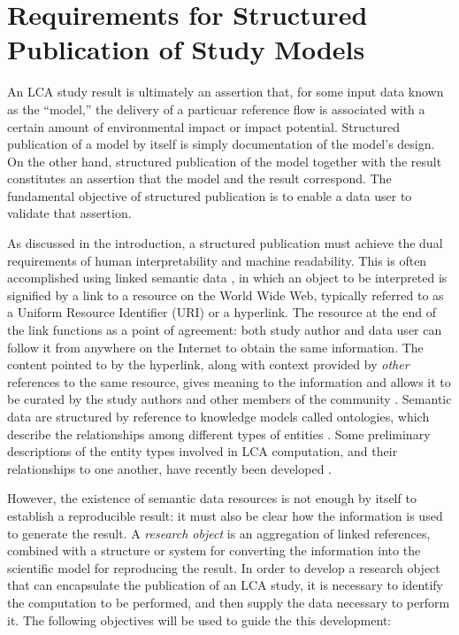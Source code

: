 \section{Requirements for Structured Publication of Study Models}

An LCA study result is ultimately an assertion that, for some input data known as the ``model,'' the delivery of a particuar reference flow %
is associated with a certain amount of environmental impact or impact potential.  Structured publication of a model by itself is simply documentation of the model's design.  On the other hand, structured publication of the model together with the result constitutes an assertion that the model and the result correspond.  The fundamental objective of structured publication is to enable a data user to validate that assertion.

As discussed in the introduction, a structured publication %
must achieve the dual requirements of human interpretability and machine readability.  %
This is often accomplished using linked semantic data \citep{Bizer_2009}, in which an object to be interpreted is signified by a link to a resource on the World Wide Web, typically referred to as a Uniform Resource Identifier (URI) or a hyperlink.  The resource at the end of the link functions as a point of agreement: both study author and data user can follow it from anywhere on the Internet to obtain the same information.  The content pointed to by the hyperlink, along with context provided by \emph{other} references to the same resource, gives meaning to the information and allows it to be curated by the study authors and other members of the community \citep{Khan_2011}.  Semantic data are structured by reference to knowledge models called ontologies, which describe the relationships among different types of entities \citep{Madin2008}.  
Some preliminary descriptions of the entity types involved in LCA computation, and their relationships to one another, have recently been developed \citep{Ciroth_Srocka_2014, Janowicz_WOP_2015, Kuczenski_JCP_2016}.

However, the existence of semantic data resources is not enough by itself to establish a reproducible result: it must also be clear how the information is used to generate the result.  A \emph{research object} \citep{Bechhofer_2013} is an aggregation of linked references, combined with a structure or system for converting the information into the scientific model for reproducing the result.  In order to develop a research object that can encapsulate the publication of an LCA study, it is necessary to identify the computation to be performed, and then supply the data necessary to perform it. The following objectives will be used to guide the this development:

